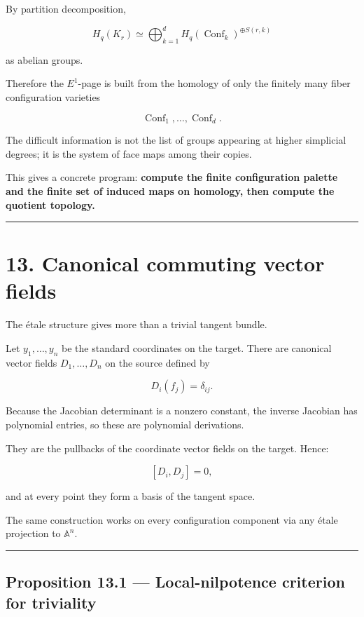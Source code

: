 By partition decomposition,

\[
H_q(K_r)
\simeq
\bigoplus_{k=1}^d
H_q(\operatorname{Conf}_k)^{\oplus S(r,k)}
\]

as abelian groups.

Therefore the \(E^1\)-page is built from the homology of only the
finitely many fiber configuration varieties

\[
\operatorname{Conf}_1,\dots,\operatorname{Conf}_d.
\]

The difficult information is not the list of groups appearing at higher
simplicial degrees; it is the system of face maps among their copies.

This gives a concrete program: \textbf{compute the finite configuration
palette and the finite set of induced maps on homology, then compute the
quotient topology.}

\begin{center}\rule{0.5\linewidth}{0.5pt}\end{center}

\section{13. Canonical commuting vector
fields}\label{canonical-commuting-vector-fields}

The étale structure gives more than a trivial tangent bundle.

Let \(y_1,\dots,y_n\) be the standard coordinates on the target. There
are canonical vector fields \(D_1,\dots,D_n\) on the source defined by

\[
D_i(f_j)=\delta_{ij}.
\]

Because the Jacobian determinant is a nonzero constant, the inverse
Jacobian has polynomial entries, so these are polynomial derivations.

They are the pullbacks of the coordinate vector fields on the target.
Hence:

\[
[D_i,D_j]=0,
\]

and at every point they form a basis of the tangent space.

The same construction works on every configuration component via any
étale projection to \(\mathbb A^n\).

\begin{center}\rule{0.5\linewidth}{0.5pt}\end{center}

\subsection{Proposition 13.1 --- Local-nilpotence criterion for
triviality}\label{proposition-13.1-local-nilpotence-criterion-for-triviality}

